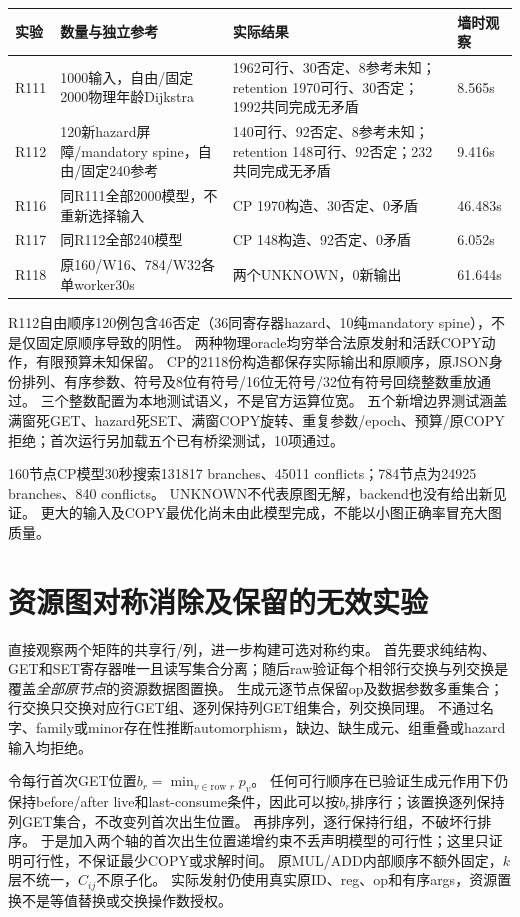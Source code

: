\documentclass[UTF8,11pt,a4paper]{ctexart}
\begin{document}
\begin{longtable}{p{}p{}p{}p{}}
\toprule
实验 & 数量与独立参考 & 实际结果 & 墙时观察\\
\midrule
R111 & 1000输入，自由/固定2000物理年龄Dijkstra & 1962可行、30否定、8参考未知；retention 1970可行、30否定；1992共同完成无矛盾 & 8.565s\\
R112 & 120新hazard屏障/mandatory spine，自由/固定240参考 & 140可行、92否定、8参考未知；retention 148可行、92否定；232共同完成无矛盾 & 9.416s\\
R116 & 同R111全部2000模型，不重新选择输入 & CP 1970构造、30否定、0矛盾 & 46.483s\\
R117 & 同R112全部240模型 & CP 148构造、92否定、0矛盾 & 6.052s\\
R118 & 原160/W16、784/W32各单worker30s & 两个UNKNOWN，0新输出 & 61.644s\\
\bottomrule
\end{longtable}
R112自由顺序120例包含46否定（36同寄存器hazard、10纯mandatory spine），不是仅固定原顺序导致的阴性。
两种物理oracle均穷举合法原发射和活跃COPY动作，有限预算未知保留。
CP的2118份构造都保存实际输出和原顺序，原JSON身份排列、有序参数、符号及8位有符号/16位无符号/32位有符号回绕整数重放通过。
三个整数配置为本地测试语义，不是官方运算位宽。
五个新增边界测试涵盖满窗死GET、hazard死SET、满窗COPY旋转、重复参数/epoch、预算/原COPY拒绝；首次运行另加载五个已有桥梁测试，10项通过。

160节点CP模型30秒搜索131817 branches、45011 conflicts；784节点为24925 branches、840 conflicts。
UNKNOWN不代表原图无解，backend也没有给出新见证。
更大的输入及COPY最优化尚未由此模型完成，不能以小图正确率冒充大图质量。

\section{资源图对称消除及保留的无效实验}
直接观察两个矩阵的共享行/列，进一步构建可选对称约束。
首先要求纯结构、GET和SET寄存器唯一且读写集合分离；随后raw验证每个相邻行交换与列交换是覆盖\emph{全部原节点}的资源数据图置换。
生成元逐节点保留op及数据参数多重集合；行交换只交换对应行GET组、逐列保持列GET组集合，列交换同理。
不通过名字、family或minor存在性推断automorphism，缺边、缺生成元、组重叠或hazard输入均拒绝。

令每行首次GET位置$b_r=\min_{v\in\text{row }r}p_v$。
任何可行顺序在已验证生成元作用下仍保持before/after live和last-consume条件，因此可以按$b_r$排序行；该置换逐列保持列GET集合，不改变列首次出生位置。
再排序列，逐行保持行组，不破坏行排序。
于是加入两个轴的首次出生位置递增约束不丢声明模型的可行性；这里只证明可行性，不保证最少COPY或求解时间。
原MUL/ADD内部顺序不额外固定，$k$层不统一，$C_{ij}$不原子化。
实际发射仍使用真实原ID、reg、op和有序args，资源置换不是等值替换或交换操作数授权。
\end{document}
